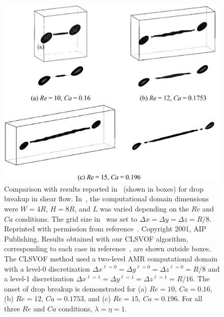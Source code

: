 \documentclass[%
 reprint,
 showkeys,
 amsmath,amssymb,
 aps,
 prfluids,
 onecolumn
]{revtex4-2}
\begin{document}
\begin{figure}[h!]
  \centering
  \includegraphics[width=\textwidth]{DropBreakComparison}
  \caption{Comparison with results reported 
	in~\cite{RenCri01-2} 
	(shown in boxes) 
        for drop breakup in shear flow.  
	In~\cite{RenCri01-2},
	the computational domain
        dimensions were 
	$W=4R$, $H=8R$, and $L$ was varied depending 
        on the $Re$ and $Ca$ conditions.  The
	grid size 
	in~\cite{RenCri01-2} 
	was set to 
        $\Delta x=\Delta y=\Delta z=R/8$.  
	Reprinted with permission from 
        reference~\cite{RenCri01-2}. 
	Copyright 2001, AIP Publishing. 
	Results
        obtained with our CLSVOF algorithm, corresponding to each case in
        reference~\cite{RenCri01-2}, are shown outside boxes.  The
        CLSVOF method used a two-level AMR computational domain 
        with a level-0 discretization 
	$\Delta x^{\ell=0} = \Delta y^{\ell=0} = \Delta z^{\ell=0} = R/8$ 
	and a level-1 discretization
        $\Delta x^{\ell=1} = \Delta y^{\ell=1} = \Delta z^{\ell=1} = R/16$. 
        The onset of drop breakup is demonstrated for (a) $Re=10$,
        $Ca=0.16$, (b) $Re=12$, $Ca=0.1753$, and (c) $Re=15$, $Ca=0.196$.
        For all three $Re$ and $Ca$ conditions, $\lambda = \eta = 1$.}
  \label{fig:DropBreakComp}
\end{figure}
%
\end{document}

